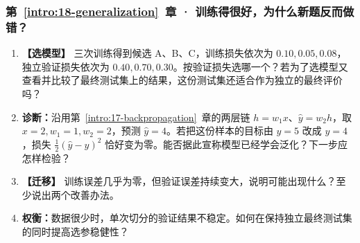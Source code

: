 \subsubsection*{第~\ref*{intro:18-generalization}~章 · 训练得很好，为什么新题反而做错？}
\begin{enumerate}[label={},leftmargin=4.8em,itemsep=4pt]
\item[\textbf{C-019.}] \leavevmode{}\label{exercise:C-019}\label{exercise:validation-checkpoint-choice}\textbf{【选模型】} 三次训练得到候选 A、B、C，训练损失依次为 $0.10,0.05,0.08$，独立验证损失依次为 $0.40,0.70,0.30$。按验证损失选哪一个？若为了选模型又查看并比较了最终测试集上的结果，这份测试集还适合作为独立的最终评价吗？
\item[\textbf{C-020.}] \leavevmode{}\label{exercise:C-020}\label{exercise:zero-loss-generalization}\textbf{诊断：}沿用第~\ref*{intro:17-backpropagation}~章的两层链 $h=w_1x$、$\widehat{y}=w_2h$，取 $x=2,w_1=1,w_2=2$，预测 $\widehat{y}=4$。若把这份样本的目标由 $y=5$ 改成 $y=4$，损失 $\tfrac12(\widehat{y}-y)^2$ 恰好变为零。能否据此宣称模型已经学会泛化？下一步应怎样检验？
\item[\textbf{C-021.}] \leavevmode{}\label{exercise:C-021}\label{exercise:validation-overfitting}\textbf{【迁移】} 训练误差几乎为零，但验证误差持续变大，说明可能出现什么？至少说出两个改善办法。
\item[\textbf{C-022.}] \leavevmode{}\label{exercise:C-022}\label{exercise:small-data-validation}\textbf{权衡：}数据很少时，单次切分的验证结果不稳定。如何在保持独立最终测试集的同时提高选参稳健性？
\end{enumerate}
